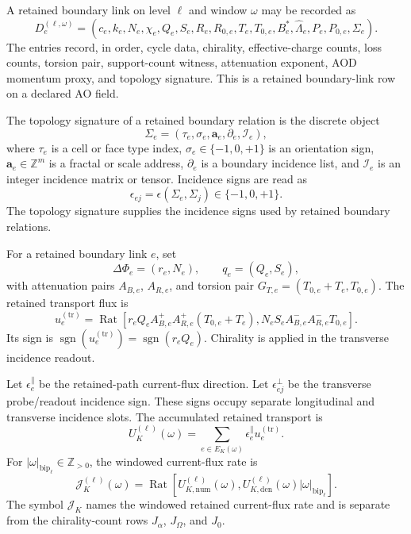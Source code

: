 \begin{definition}
\label{def:retained-boundary-link-row}
A retained boundary link on level \(\ell\) and window \(\omega\) may be recorded as
\[
D_e^{(\ell,\omega)}=
\left(
 c_e,k_e,N_e,
 \chi_e,
 Q_e,S_e,
 R_e,R_{0,e},
 T_e,T_{0,e},
 B_e^*,\widehat\Lambda_e,
 P_e,P_{0,e},
 \Sigma_e
\right).
\]
The entries record, in order, cycle data, chirality, effective-charge counts, loss counts, torsion pair, support-count witness, attenuation exponent, AOD momentum proxy, and topology signature. This is a retained boundary-link row on a declared AO field.
\end{definition}

\begin{definition}
\label{def:topology-signature}
The topology signature of a retained boundary relation is the discrete object
\[
\Sigma_e=(\tau_e,\sigma_e,\mathbf a_e,\partial_e,\mathcal I_e),
\]
where \(\tau_e\) is a cell or face type index, \(\sigma_e\in\{-1,0,+1\}\) is an orientation sign, \(\mathbf a_e\in\mathbb Z^m\) is a fractal or scale address, \(\partial_e\) is a boundary incidence list, and \(\mathcal I_e\) is an integer incidence matrix or tensor. Incidence signs are read as
\[
\epsilon_{ej}=\epsilon(\Sigma_e,\Sigma_j)\in\{-1,0,+1\}.
\]
The topology signature supplies the incidence signs used by retained boundary relations.
\end{definition}

\begin{definition}
\label{def:exact-transport-flux}
For a retained boundary link \(e\), set
\[
\Delta\Phi_e=(r_e,N_e),
\qquad
q_e=(Q_e,S_e),
\]
with attenuation pairs \(A_{B,e}\), \(A_{R,e}\), and torsion pair \(G_{T,e}=(T_{0,e}+T_e,T_{0,e})\). The retained transport flux is
\[
u_e^{(\mathrm{tr})}
=
\operatorname{Rat}
\left[
 r_e Q_e A_{B,e}^{+}A_{R,e}^{+}(T_{0,e}+T_e),
 N_e S_e A_{B,e}^{-}A_{R,e}^{-}T_{0,e}
\right].
\]
Its sign is \(\operatorname{sgn}(u_e^{(\mathrm{tr})})=\operatorname{sgn}(r_eQ_e)\). Chirality is applied in the transverse incidence readout.
\end{definition}

\begin{definition}
\label{def:windowed-current-flux-rate}
Let \(\epsilon_e^{\parallel}\) be the retained-path current-flux direction. Let \(\epsilon_{ej}^{\perp}\) be the transverse probe/readout incidence sign. These signs occupy separate longitudinal and transverse incidence slots. The accumulated retained transport is
\[
U_K^{(\ell)}(\omega)
=
\sum_{e\in E_K(\omega)}\epsilon_e^{\parallel}u_e^{(\mathrm{tr})}.
\]
For \(|\omega|_{\mathrm{bip}_{\ell}}\in\mathbb Z_{>0}\), the windowed current-flux rate is
\[
\mathcal J_K^{(\ell)}(\omega)
=
\operatorname{Rat}
\left[
U_{K,\mathrm{num}}^{(\ell)}(\omega),
U_{K,\mathrm{den}}^{(\ell)}(\omega)|\omega|_{\mathrm{bip}_{\ell}}
\right].
\]
The symbol \(\mathcal J_K\) names the windowed retained current-flux rate and is separate from the chirality-count rows \(J_{\alpha}\), \(J_{\Omega}\), and \(J_0\).
\end{definition}

